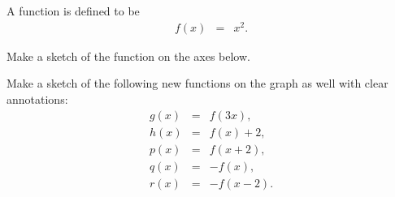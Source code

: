 
\begin{problem}
\item A function is defined to be
  \begin{eqnarray*}
    f(x) & = & x^2.
  \end{eqnarray*}
  \begin{subproblem}
  \item Make a sketch of the function on the axes below.
  \item Make a sketch of the following new functions on the graph as
    well with clear annotations:
    \begin{eqnarray*}
      g(x) & = & f(3x), \\
      h(x) & = & f(x)+2, \\
      p(x) & = & f(x+2), \\
      q(x) & = & -f(x), \\
      r(x) & = & -f(x-2).
    \end{eqnarray*}

    \scalebox{0.95}{}

  \end{subproblem}
\end{problem}


